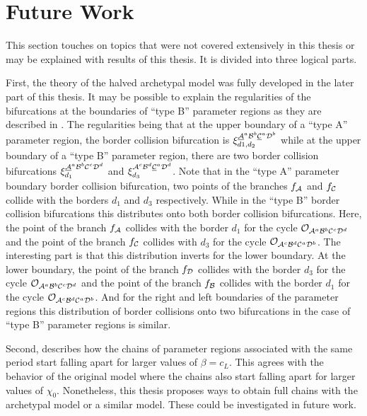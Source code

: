\section{Future Work}
\label{sec:concl.future}

This section touches on topics that were not covered extensively in this thesis or may be explained with results of this thesis.
It is divided into three logical parts.

First, the theory of the halved archetypal model was fully developed in the later part of this thesis.
It may be possible to explain the regularities of the bifurcations at the boundaries of ``type B'' parameter regions as they are described in .
The regularities being that at the upper boundary of a ``type A'' parameter region, the border collision bifurcation is $\xi_{d1, d_2}^{\underline{\mathcal{A}}^a\mathcal{B}^b\underline{\mathcal{C}}^a\mathcal{D}^b}$ while at the upper boundary of a ``type B'' parameter region, there are two border collision bifurcations $\xi_{d_1}^{\underline{\mathcal{A}}^a\mathcal{B}^b\mathcal{C}^c\mathcal{D}^d}$ and $\xi_{d_3}^{\mathcal{A}^c\mathcal{B}^d\underline{\mathcal{C}}^a\mathcal{D}^d}$.
Note that in the ``type A'' parameter boundary border collision bifurcation, two points of the branches $f_{\mathcal{A}}$ and $f_{\mathcal{C}}$ collide with the borders $d_1$ and $d_3$ respectively.
While in the ``type B'' border collision bifurcations this distributes onto both border collision bifurcations.
Here, the point of the branch $f_{\mathcal{A}}$ collides with the border $d_1$ for the cycle $\mathcal{O}_{\mathcal{A}^a\mathcal{B}^b\mathcal{C}^c\mathcal{D}^d}$ and the point of the branch $f_{\mathcal{C}}$ collides with $d_3$ for the cycle $\mathcal{O}_{\mathcal{A}^c\mathcal{B}^d\mathcal{C}^a\mathcal{D}^b}$.
The interesting part is that this distribution inverts for the lower boundary.
At the lower boundary, the point of the branch $f_{\mathcal{D}}$ collides with the border $d_3$ for the cycle $\mathcal{O}_{\mathcal{A}^a\mathcal{B}^b\mathcal{C}^c\mathcal{D}^d}$ and the point of the branch $f_{\mathcal{B}}$ collides with the border $d_1$ for the cycle $\mathcal{O}_{\mathcal{A}^c\mathcal{B}^d\mathcal{C}^a\mathcal{D}^b}$.
And for the right and left boundaries of the parameter regions this distribution of border collisions onto two bifurcations in the case of ``type B'' parameter regions is similar.

Second,  describes how the chains of parameter regions associated with the same period start falling apart for larger values of $\beta = c_L$.
This agrees with the behavior of the original model where the chains also start falling apart for larger values of $\chi_0$.
Nonetheless, this thesis proposes ways to obtain full chains with the archetypal model or a similar model.
These could be investigated in future work.

